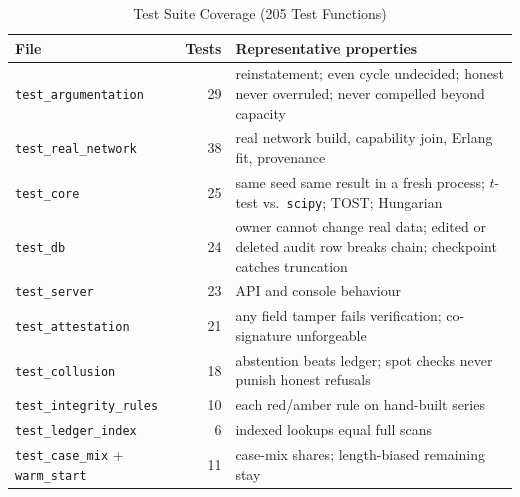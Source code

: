 \begin{table}[!t]
\centering
\caption{Test Suite Coverage (205 Test Functions)}
\label{tab:tests}
\scriptsize
\setlength{\tabcolsep}{2.5pt}
\begin{tabular}{@{}lrp{3.95cm}@{}}
\toprule
File & Tests & Representative properties \\
\midrule
\texttt{test\_argumentation} & 29 & reinstatement; even cycle undecided; honest never overruled; never compelled beyond capacity \\
\texttt{test\_real\_network} & 38 & real network build, capability join, Erlang fit, provenance \\
\texttt{test\_core} & 25 & same seed same result in a fresh process; $t$-test vs.\ \texttt{scipy}; TOST; Hungarian \\
\texttt{test\_db} & 24 & owner cannot change real data; edited or deleted audit row breaks chain; checkpoint catches truncation \\
\texttt{test\_server} & 23 & API and console behaviour \\
\texttt{test\_attestation} & 21 & any field tamper fails verification; co-signature unforgeable \\
\texttt{test\_collusion} & 18 & abstention beats ledger; spot checks never punish honest refusals \\
\texttt{test\_integrity\_rules} & 10 & each red/amber rule on hand-built series \\
\texttt{test\_ledger\_index} & 6 & indexed lookups equal full scans \\
\texttt{test\_case\_mix} + \texttt{warm\_start} & 11 & case-mix shares; length-biased remaining stay \\
\bottomrule
\end{tabular}
\end{table}
